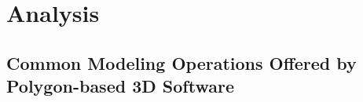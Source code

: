 \chapter{Analysis}







\section{Common Modeling Operations Offered by Polygon-based 3D Software}








